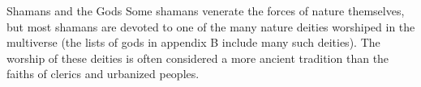 \begin{DndComment}{Shamans and the Gods}
 Some shamans venerate the forces of nature themselves, but most shamans are devoted to one of the many nature deities worshiped in the multiverse (the lists of gods in appendix B include many such deities). The worship of these deities is often considered a more ancient tradition than the faiths of clerics and urbanized peoples.
\end{DndComment}